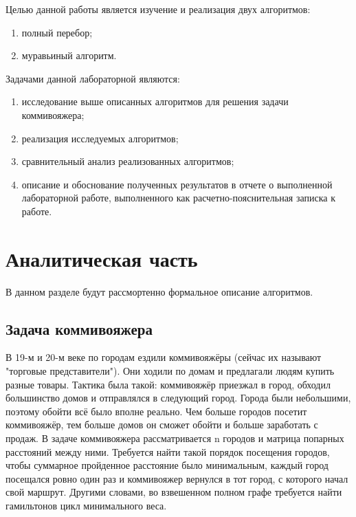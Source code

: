 Целью данной работы является изучение и реализация двух алгоритмов:
\begin{enumerate}
  \item полный перебор;
  \item муравьиный алгоритм.
\end{enumerate}
Задачами данной лабораторной являются:
\begin{enumerate}
  \item исследование выше описанных алгоритмов для решения задачи коммивояжера;
  \item реализация исследуемых алгоритмов;
  \item сравнительный анализ реализованных алгоритмов;
  \item описание и обоснование полученных результатов в отчете о выполненной лабораторной работе, выполненного как расчетно-пояснительная 
        записка к работе.
\end{enumerate}

\chapter{Аналитическая часть}\label{Analis}

В данном разделе будут рассмортенно формальное описание алгоритмов.

\section{Задача коммивояжера}\label{BubbleSort}

В 19-м и 20-м веке по городам ездили коммивояжёры (сейчас их называют "торговые представители"). Они ходили по домам и предлагали людям
купить разные товары. Тактика была такой: коммивояжёр приезжал в город, обходил большинство домов и отправлялся в следующий город.
Города были небольшими, поэтому обойти всё было вполне реально. Чем больше городов посетит коммивояжёр, тем больше домов он сможет 
обойти и больше заработать с продаж. В задаче коммивояжера рассматривается n городов и матрица попарных расстояний между ними. 
Требуется найти такой порядок посещения городов, чтобы суммарное пройденное расстояние было минимальным, каждый
город посещался ровно один раз и коммивояжер вернулся в тот город, с которого начал свой маршрут. Другими словами, 
во взвешенном полном графе требуется найти гамильтонов цикл минимального веса.

